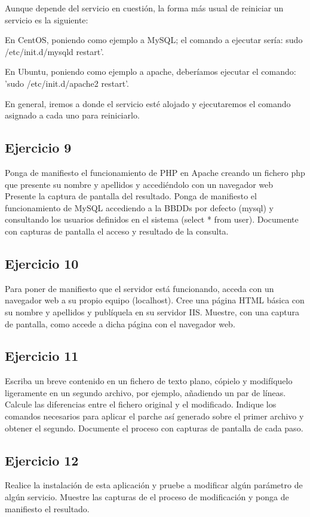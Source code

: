 \documentclass[a4paper, 11pt]{article} %
\begin{document}
Aunque depende del servicio en cuestión, la forma más usual de reiniciar un servicio es la siguiente: 

En CentOS, poniendo como ejemplo a MySQL; el comando a ejecutar sería: sudo /etc/init.d/mysqld restart'. 

En Ubuntu, poniendo como ejemplo a apache, deberíamos ejecutar el comando: 'sudo /etc/init.d/apache2 restart'. 

En general, iremos a donde el servicio esté alojado y ejecutaremos el comando asignado a cada uno para reiniciarlo. 

\subsection{Ejercicio 9}
Ponga de manifiesto el funcionamiento de PHP en Apache creando un
fichero php que presente su nombre y apellidos y accediéndolo con un navegador web
Presente la captura de pantalla del resultado. Ponga de manifiesto el funcionamiento
de MySQL accediendo a la BBDDs por defecto (mysql) y consultando los usuarios
definidos en el sistema (select * from user). Documente con capturas de pantalla el
acceso y resultado de la consulta.


\subsection{Ejercicio 10}
Para poner de manifiesto que el servidor está funcionando, acceda con
un navegador web a su propio equipo (localhost). Cree una página HTML básica con su
nombre y apellidos y publíquela en su servidor IIS. Muestre, con una captura de
pantalla, como accede a dicha página con el navegador web.


\subsection{Ejercicio 11}
Escriba un breve contenido en un fichero de texto plano, cópielo y
modifíquelo ligeramente en un segundo archivo, por ejemplo, añadiendo un par de
líneas. Calcule las diferencias entre el fichero original y el modificado. Indique los
comandos necesarios para aplicar el parche así generado sobre el primer archivo y
obtener el segundo. Documente el proceso con capturas de pantalla de cada paso.


\subsection{Ejercicio 12}
Realice la instalación de esta aplicación y pruebe a modificar algún
parámetro de algún servicio. Muestre las capturas de el proceso de modificación y
ponga de manifiesto el resultado.
\end{document}
